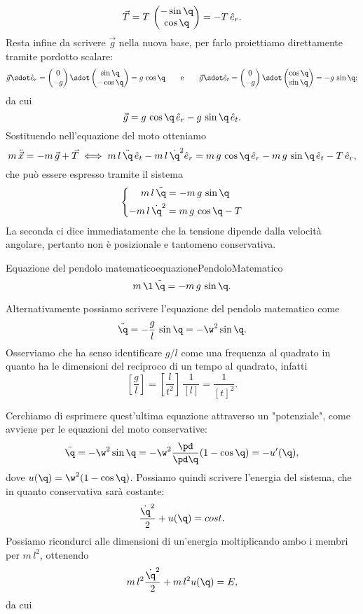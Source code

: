 \[
	\vec{T} = T\,\begin{pmatrix}-\sin\q\\\cos \q\end{pmatrix} = -T\,\hat{e}_r.
\]
Resta infine da scrivere \(\vec{g}\) nella nuova base, per farlo proiettiamo direttamente tramite pordotto scalare:
\[
	\vec{g}\sdot \hat{e}_r = \begin{pmatrix}0\\-g\end{pmatrix}\sdot\begin{pmatrix}\sin\q\\-\cos\q\end{pmatrix} = g\,\cos\q \qquad\text{e}\qquad
	\vec{g}\sdot \hat{e}_t = \begin{pmatrix}0\\-g\end{pmatrix}\sdot\begin{pmatrix}\cos\q\\\sin\q\end{pmatrix} = -g\,\sin\q;
\]
da cui
\[
	\vec{g} = g\,\cos\q\,\hat{e}_r - g\,\sin\q\,\hat{e}_t.
\]
Sostituendo nell'equazione del moto otteniamo
\[
	m\,\ddot{\vec{x}} = -m\,\vec{g}+\vec{T} \iff m\,l\,\ddot{\q}\,\hat{e}_t - m\,l\,\dot{\q}^2 \hat{e}_r = m\,g\,\cos\q\,\hat{e}_r - m\,g\,\sin\q\,\hat{e}_t - T\,\hat{e}_r,
\]
che può essere espresso tramite il sistema
\[
	\left\{\begin{aligned}
		m\,l\,\ddot{\q}   & = -m\,g\,\sin\q     \\
		-m\,l\,\dot{\q}^2 & = m\,g\,\cos\q - T
	\end{aligned}\right.
\]
La seconda ci dice immediatamente che la tensione dipende dalla velocità angolare, pertanto non è posizionale e tantomeno conservativa.

\begin{remark}{Equazione del pendolo matematico}{equazionePendoloMatematico}
	\[
		m\,\l\,\ddot{\q} = -m\,g\,\sin\q.
	\]
\end{remark}

\begin{notz}
	Alternativamente possiamo scrivere l'equazione del pendolo matematico come
	\[
		\ddot{\q} = -\frac{g}{l}\,\sin\q = -\w^2\sin\q.
	\]
	Osserviamo che ha senso identificare \(g/l\) come una frequenza al quadrato in quanto ha le dimensioni del reciproco di un tempo al quadrato, infatti
	\[
		\left[ \frac{g}{l} \right]  = \left[ \frac{l}{t^2} \right]\,\frac{1}{[l]} = \frac{1}{[t]^2}.
	\]
\end{notz}
\noindent
Cerchiamo di esprimere quest'ultima equazione attraverso un "potenziale", come avviene per le equazioni del moto conservative:
\[
	\ddot{\q} = -\w^2\sin\q = -\w^2 \frac{\pd}{\pd\q}(1-\cos\q) = -u'(\q),
\]
dove \(u(\q) = \w^2(1-\cos\q)\). Possiamo quindi scrivere l'energia del sistema, che in quanto conservativa sarà costante:
\[
	\frac{\dot{\q}^2}{2} + u(\q) = cost.
\]
Possiamo ricondurci alle dimensioni di un'energia moltiplicando ambo i membri per \(m\,l^2\), ottenendo
\[
	m\,l^2 \frac{\dot{\q}^2}{2} + m\,l^2 u(\q) = E,
\]
da cui

